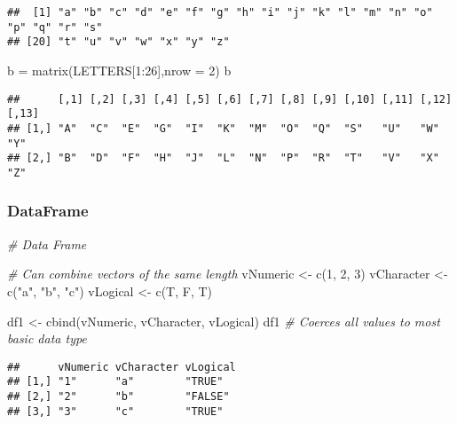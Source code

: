 \documentclass[
]{article}
\newenvironment{Shaded}{\begin{snugshade}}{\end{snugshade}}
\newcommand{\AttributeTok}[1]{\textcolor[rgb]{0.77,0.63,0.00}{#1}}
\newcommand{\CommentTok}[1]{\textcolor[rgb]{0.56,0.35,0.01}{\textit{#1}}}
\newcommand{\DecValTok}[1]{\textcolor[rgb]{0.00,0.00,0.81}{#1}}
\newcommand{\FunctionTok}[1]{\textcolor[rgb]{0.00,0.00,0.00}{#1}}
\newcommand{\NormalTok}[1]{#1}
\newcommand{\OtherTok}[1]{\textcolor[rgb]{0.56,0.35,0.01}{#1}}
\newcommand{\SpecialCharTok}[1]{\textcolor[rgb]{0.00,0.00,0.00}{#1}}
\newcommand{\StringTok}[1]{\textcolor[rgb]{0.31,0.60,0.02}{#1}}
\begin{document}
\begin{verbatim}
##  [1] "a" "b" "c" "d" "e" "f" "g" "h" "i" "j" "k" "l" "m" "n" "o" "p" "q" "r" "s"
## [20] "t" "u" "v" "w" "x" "y" "z"
\end{verbatim}

\begin{Shaded}
\begin{Highlighting}[]
\NormalTok{b }\OtherTok{=} \FunctionTok{matrix}\NormalTok{(LETTERS[}\DecValTok{1}\SpecialCharTok{:}\DecValTok{26}\NormalTok{],}\AttributeTok{nrow =} \DecValTok{2}\NormalTok{)}
\NormalTok{b}
\end{Highlighting}
\end{Shaded}

\begin{verbatim}
##      [,1] [,2] [,3] [,4] [,5] [,6] [,7] [,8] [,9] [,10] [,11] [,12] [,13]
## [1,] "A"  "C"  "E"  "G"  "I"  "K"  "M"  "O"  "Q"  "S"   "U"   "W"   "Y"  
## [2,] "B"  "D"  "F"  "H"  "J"  "L"  "N"  "P"  "R"  "T"   "V"   "X"   "Z"
\end{verbatim}

\hypertarget{dataframe}{%
\subsubsection{DataFrame}\label{dataframe}}

\begin{Shaded}
\begin{Highlighting}[]
\CommentTok{\# Data Frame}

\CommentTok{\# Can combine vectors of the same length}
\NormalTok{vNumeric   }\OtherTok{\textless{}{-}} \FunctionTok{c}\NormalTok{(}\DecValTok{1}\NormalTok{, }\DecValTok{2}\NormalTok{, }\DecValTok{3}\NormalTok{)}
\NormalTok{vCharacter }\OtherTok{\textless{}{-}} \FunctionTok{c}\NormalTok{(}\StringTok{"a"}\NormalTok{, }\StringTok{"b"}\NormalTok{, }\StringTok{"c"}\NormalTok{)}
\NormalTok{vLogical   }\OtherTok{\textless{}{-}} \FunctionTok{c}\NormalTok{(T, F, T)}

\NormalTok{df1 }\OtherTok{\textless{}{-}} \FunctionTok{cbind}\NormalTok{(vNumeric, vCharacter, vLogical)}
\NormalTok{df1  }\CommentTok{\# Coerces all values to most basic data type}
\end{Highlighting}
\end{Shaded}

\begin{verbatim}
##      vNumeric vCharacter vLogical
## [1,] "1"      "a"        "TRUE"  
## [2,] "2"      "b"        "FALSE" 
## [3,] "3"      "c"        "TRUE"
\end{verbatim}
\end{document}
